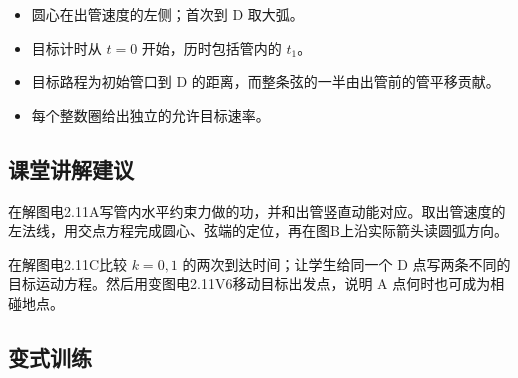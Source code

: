\documentclass[UTF8,fontset=fandol,a4paper,11pt]{ctexart}
\begin{document}
\begin{itemize}
\item 圆心在出管速度的左侧；首次到 D 取大弧。
\item 目标计时从 $t=0$ 开始，历时包括管内的 $t_1$。
\item 目标路程为初始管口到 D 的距离，而整条弦的一半由出管前的管平移贡献。
\item 每个整数圈给出独立的允许目标速率。
\end{itemize}



\subsection*{课堂讲解建议}

在解图电2.11A写管内水平约束力做的功，并和出管竖直动能对应。取出管速度的左法线，用交点方程完成圆心、弦端的定位，再在图B上沿实际箭头读圆弧方向。

在解图电2.11C比较 $k=0,1$ 的两次到达时间；让学生给同一个 D 点写两条不同的目标运动方程。然后用变图电2.11V6移动目标出发点，说明 A 点何时也可成为相碰地点。


\subsection*{变式训练}
\end{document}
